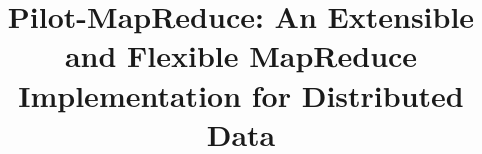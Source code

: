 \documentclass{acm_proc_article-sp}
\begin{document}

\title{Pilot-MapReduce: An Extensible and Flexible
  MapReduce Implementation for Distributed Data}

%
%
%
%
%
\end{document}
